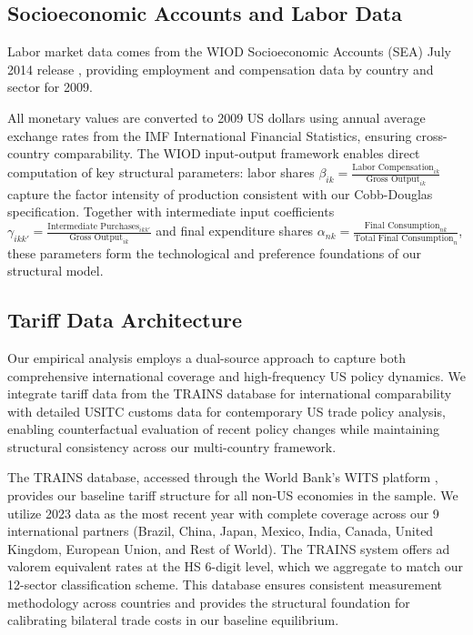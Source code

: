 



\subsection{Socioeconomic Accounts and Labor Data}

Labor market data comes from the WIOD Socioeconomic Accounts (SEA) July 2014 release \citep{timmer2015illustrated}, providing employment and compensation data by country and sector for 2009. 

All monetary values are converted to 2009 US dollars using annual average exchange rates from the IMF International Financial Statistics, ensuring cross-country comparability. The WIOD input-output framework enables direct computation of key structural parameters: labor shares $\beta_{ik} = \frac{\text{Labor Compensation}_{ik}}{\text{Gross Output}_{ik}}$ capture the factor intensity of production consistent with our Cobb-Douglas specification. Together with intermediate input coefficients $\gamma_{ikk'} = \frac{\text{Intermediate Purchases}_{ikk'}}{\text{Gross Output}_{ik}}$ and final expenditure shares $\alpha_{nk} = \frac{\text{Final Consumption}_{nk}}{\text{Total Final Consumption}_{n}}$, these parameters form the technological and preference foundations of our structural model.

\subsection{Tariff Data Architecture}

Our empirical analysis employs a dual-source approach to capture both comprehensive international coverage and high-frequency US policy dynamics. We integrate tariff data from the TRAINS database for international comparability with detailed USITC customs data for contemporary US trade policy analysis, enabling counterfactual evaluation of recent policy changes while maintaining structural consistency across our multi-country framework.

The TRAINS database, accessed through the World Bank's WITS platform \citep{WITS2025}, provides our baseline tariff structure for all non-US economies in the sample. We utilize 2023 data as the most recent year with complete coverage across our 9 international partners (Brazil, China, Japan, Mexico, India, Canada, United Kingdom, European Union, and Rest of World). The TRAINS system offers ad valorem equivalent rates at the HS 6-digit level, which we aggregate to match our 12-sector classification scheme. This database ensures consistent measurement methodology across countries and provides the structural foundation for calibrating bilateral trade costs in our baseline equilibrium.

